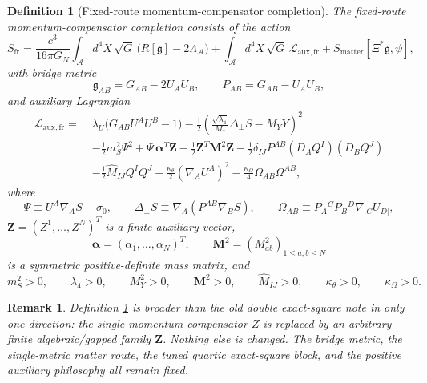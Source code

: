 \documentclass[11pt]{article}
\newcommand{\Sub}{\mathcal{A}}
\newcommand{\BridgeMetric}{\mathfrak{g}}
\newtheorem{definition}{Definition}
\newtheorem{remark}{Remark}
\begin{document}
\begin{definition}[Fixed-route momentum-compensator completion]
\label{def:frclass}
The \emph{fixed-route momentum-compensator completion} consists of the action
\begin{equation}
S_{\mathrm{fr}}
=
\frac{c^3}{16\pi G_N}
\int_{\Sub} d^4X\,\sqrt{G}\,\bigl(R[\BridgeMetric]-2\Lambda_{\Sub}\bigr)
+\int_{\Sub} d^4X\,\sqrt{G}\,\mathcal L_{\mathrm{aux,fr}}
+S_{\mathrm{matter}}[\Xi^*\BridgeMetric,\psi],
\label{eq:Sfr}
\end{equation}
with bridge metric
\begin{equation}
\BridgeMetric_{AB}=G_{AB}-2U_AU_B,
\qquad
P_{AB}=G_{AB}-U_AU_B,
\label{eq:bridge}
\end{equation}
and auxiliary Lagrangian
\begin{align}
\mathcal L_{\mathrm{aux,fr}}
=\;&
\lambda_U\bigl(G_{AB}U^AU^B-1\bigr)
-\frac12
\left(
\frac{\sqrt{\lambda_4}}{M_*}\Delta_\perp S-M_YY
\right)^2
\nonumber\\
&-\frac12 m_S^2\Psi^2
+\Psi\,\bm\alpha^T\bm Z
-\frac12 \bm Z^T\mathbf M^2\bm Z
-\frac12\delta_{IJ}P^{AB}(D_AQ^I)(D_BQ^J)
\nonumber\\
&-\frac12\widehat M_{IJ}Q^IQ^J
-\frac{\kappa_\theta}{2}(\nabla_AU^A)^2
-\frac{\kappa_\Omega}{4}\Omega_{AB}\Omega^{AB},
\label{eq:Lfr}
\end{align}
where
\begin{equation}
\Psi\equiv U^A\nabla_A S-\sigma_0,
\qquad
\Delta_\perp S\equiv \nabla_A(P^{AB}\nabla_BS),
\qquad
\Omega_{AB}\equiv P_A{}^CP_B{}^D\nabla_{[C}U_{D]},
\label{eq:defs}
\end{equation}
\(\bm Z=(Z^1,\dots,Z^N)^T\) is a finite auxiliary vector,
\begin{equation}
\bm\alpha=(\alpha_1,\dots,\alpha_N)^T,
\qquad
\mathbf M^2=(M_{ab}^2)_{1\le a,b\le N}
\label{eq:matrix}
\end{equation}
is a symmetric positive-definite mass matrix, and
\begin{equation}
m_S^2>0,
\qquad
\lambda_4>0,
\qquad
M_Y^2>0,
\qquad
\mathbf M^2>0,
\qquad
\widehat M_{IJ}>0,
\qquad
\kappa_\theta>0,
\qquad
\kappa_\Omega>0.
\label{eq:positivity}
\end{equation}
\end{definition}

\begin{remark}
Definition \ref{def:frclass} is broader than the old double exact-square note in only one direction: the single momentum compensator \(Z\) is replaced by an arbitrary finite algebraic/gapped family \(\bm Z\). Nothing else is changed. The bridge metric, the single-metric matter route, the tuned quartic exact-square block, and the positive auxiliary philosophy all remain fixed.
\end{remark}
\end{document}
